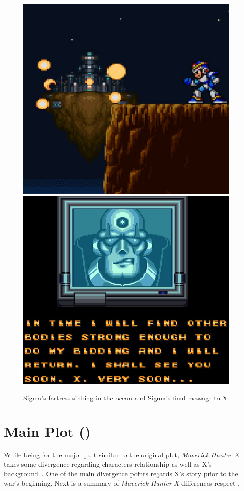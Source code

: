 \begin{figure}[htp]
	\centering
	\includegraphics[width=0.45\linewidth]{figures/X1/Ending.jpg}
	\includegraphics[width=0.45\linewidth]{figures/X1/sigma_message.jpg}
	\caption{Sigma's fortress sinking in the ocean and Sigma's final message to X.}
\end{figure}

\section{Main Plot (\mhx)}
While being for the major part similar to the original plot, \textit{Maverick Hunter X} takes some divergence regarding characters relationship as well as X's background~\cite{wiki:MM_MHX}. One of the main divergence points regards X's story prior to the war's beginning. Next is a summary of \textit{Maverick Hunter X} differences respect \x.

